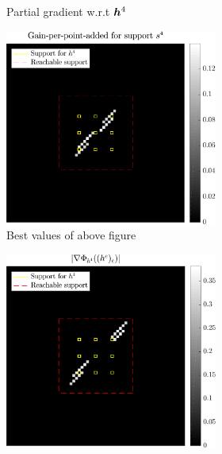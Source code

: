 \begin{figure}[!h]
\begin{subfigure}[b]{0.8\textwidth}
\begin{subfigure}[b]{0.49\linewidth}
\caption{Partial gradient w.r.t $\bm{h}^4$}
\end{subfigure}
\begin{subfigure}[b]{0.49\linewidth}\centering
\includegraphics[width=\linewidth]{figures/xp/n4/xp_128x128_sc2_angl1_K3_S3_node4_objmatrix_bestvalues.pdf}
\caption{Best values of above figure}
\end{subfigure}
\begin{subfigure}[b]{0.49\linewidth}\centering
\includegraphics[width=\linewidth]{figures/xp/n4/xp_128x128_sc2_angl1_K3_S3_node4_partgrad4_bestvalues.pdf}

\end{subfigure}
\end{subfigure}
\end{figure}
